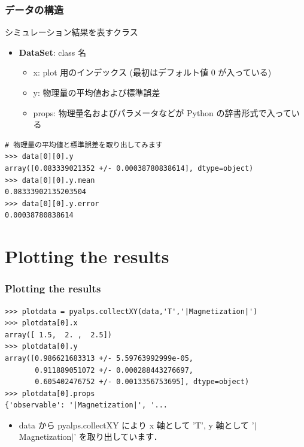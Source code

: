 \begin{frame}[t,fragile]
\frametitle{データの構造}
シミュレーション結果を表すクラス
\begin{itemize}
\item \textbf{DataSet}: class 名
  \begin{itemize}
  \item x: plot 用のインデックス (最初はデフォルト値 0 が入っている)
  \item y: 物理量の平均値および標準誤差
  \item props: 物理量名およびパラメータなどが Python の辞書形式で入っている
  \end{itemize}
\end{itemize}

\begin{lstlisting}
# 物理量の平均値と標準誤差を取り出してみます
>>> data[0][0].y
array([0.083339021352 +/- 0.00038780838614], dtype=object)
>>> data[0][0].y.mean
0.08333902135203504
>>> data[0][0].y.error
0.00038780838614
\end{lstlisting}
\end{frame}

\section{Plotting the results}
\begin{frame}[t,fragile]
\frametitle{Plotting the results}
\begin{lstlisting}
>>> plotdata = pyalps.collectXY(data,'T','|Magnetization|')
>>> plotdata[0].x
array([ 1.5,  2. ,  2.5])
>>> plotdata[0].y
array([0.986621683313 +/- 5.59763992999e-05,
       0.911889051072 +/- 0.000288443276697,
       0.605402476752 +/- 0.0013356753695], dtype=object)
>>> plotdata[0].props
{'observable': '|Magnetization|', '...
\end{lstlisting}
\begin{itemize}
\item data から pyalps.collectXY により x 軸として 'T', y 軸として '$|$Magnetization$|$' を取り出しています．
\end{itemize}
\end{frame}

